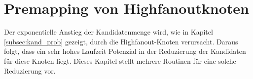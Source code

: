 \documentclass[11pt, a4paper, german]{article}
\newcommand{\TM}{Technology  Mapping }
\begin{document}

 \section{Premapping von Highfanoutknoten}
 \label{sec:premapping}
Der exponentielle Anstieg der Kandidatenmenge wird, wie in Kapitel \ref{subsec:kand_prob} gezeigt, durch die Highfanout-Knoten verursacht. Daraus folgt, dass ein sehr hohes Laufzeit Potenzial in der Reduzierung der Kandidaten für diese Knoten liegt. Dieses Kapitel stellt mehrere Routinen für eine solche Reduzierung vor.\\
\end{document}
